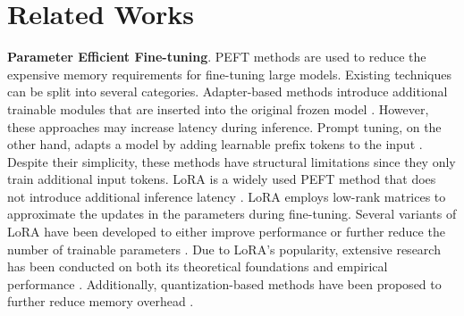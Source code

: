 \section{Related Works}
\textbf{Parameter Efficient Fine-tuning}. PEFT methods are used to reduce the expensive memory requirements for fine-tuning large models. Existing techniques can be split into several categories. Adapter-based methods introduce additional trainable modules that are inserted into the original frozen model \citep{houlsby2019parameterefficienttransferlearningnlp,pfeiffer2021adapterfusionnondestructivetaskcomposition,he2022unifiedviewparameterefficienttransfer,mahabadi2021parameterefficientmultitaskfinetuningtransformers}. However, these approaches may increase latency during inference. Prompt tuning, on the other hand, adapts a model by adding learnable prefix tokens to the input \citep{li2021prefixtuningoptimizingcontinuousprompts,lester2021powerscaleparameterefficientprompt, liu2022ptuningv2prompttuning}. Despite their simplicity, these methods have structural limitations since they only train additional input tokens. LoRA is a widely used PEFT method that does not introduce additional inference latency \citep{hu2021loralowrankadaptationlarge}. LoRA employs low-rank matrices to approximate the updates in the parameters during fine-tuning. Several variants of LoRA have been developed to either improve performance or further reduce the number of trainable parameters \citep{zhang2023adaloraadaptivebudgetallocation,xia2024chainloraefficientfinetuning,liu2024doraweightdecomposedlowrankadaptation,kopiczko2024veravectorbasedrandommatrix}. Due to LoRA's popularity, extensive research has been conducted on both its theoretical foundations and empirical performance \citep{jang2024loratrainingntkregime,hayou2024loraefficientlowrank,mao2024surveyloralargelanguage}. Additionally, quantization-based methods have been proposed to further reduce memory overhead \cite{dettmers2023qloraefficientfinetuningquantized,qin2024accuratelorafinetuningquantizationllms}. 

